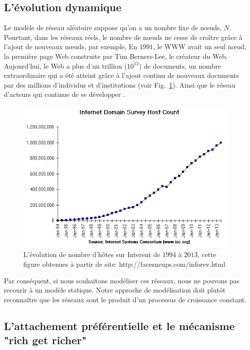 \subsection{L'évolution dynamique}
Le modèle de réseau aléatoire suppose qu'on a un nombre fixe de nœuds, $N$. Pourtant, dans les réseaux réels, le nombre de nœuds ne cesse de croître grâce à l'ajout de nouveaux nœuds, par exemple, En $1991$, le WWW avait un seul nœud, la première page Web construite par Tim Berners-Lee, le créateur du Web. Aujourd'hui, le Web a plus d'un trillion ($10^{12}$) de documents, un nombre extraordinaire qui a été atteint grâce à l'ajout continu de nouveaux documents par des millions d'individus et d'institutions (voir Fig.~\ref{hosts}). Ainsi que le réseau d'acteurs qui continue de se développer \cite{Barabasi2015}.
\begin{figure}[h]
	\centering
	\includegraphics[scale=0.5]{./figures/hosts}
	\caption{L'évolution de nombre d'hôtes sur Interent de $1994$ à $2013$, cette figure  obtenues à partir de site: http://facesncups.com/inforev.html}
	\label{hosts}
\end{figure}
Par conséquent, si nous souhaitons modéliser ces réseaux, nous ne pouvons pas recourir à un modèle statique. Notre approche de modélisation doit plutôt reconnaître que les réseaux sont le produit d'un processus de croissance constant.
\begin{sloppypar}
\subsection{L'attachement préférentielle et le mécanisme "rich get richer"}
\end{sloppypar}
